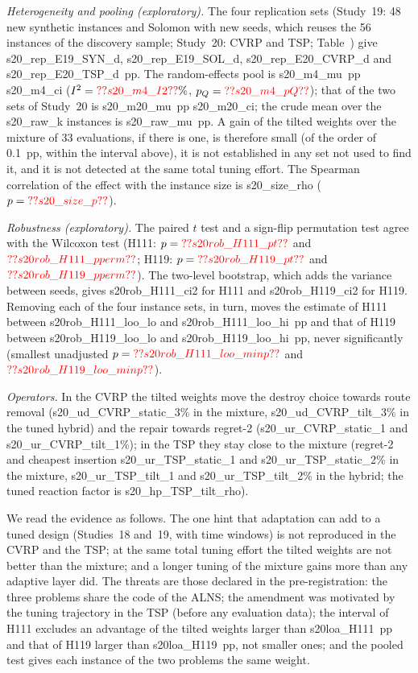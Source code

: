 \emph{Heterogeneity and pooling (exploratory).} The four replication sets (Study~19: 48 new synthetic instances and Solomon with new seeds, which reuses the 56 instances of the discovery sample; Study~20: CVRP and TSP; Table~) give \num{s20_rep_E19_SYN_d}, \num{s20_rep_E19_SOL_d}, \num{s20_rep_E20_CVRP_d} and \num{s20_rep_E20_TSP_d}~pp. The random-effects pool is \num{s20_m4_mu}~pp \num{s20_m4_ci} ($I^2=\num{s20_m4_I2}\%$, $p_Q=\num{s20_m4_pQ}$); that of the two sets of Study~20 is \num{s20_m20_mu}~pp \num{s20_m20_ci}; the crude mean over the \num{s20_raw_k} instances is \num{s20_raw_mu}~pp. A gain of the tilted weights over the mixture of 33 evaluations, if there is one, is therefore small (of the order of 0.1~pp, within the interval above), it is not established in any set not used to find it, and it is not detected at the same total tuning effort. The Spearman correlation of the effect with the instance size is \num{s20_size_rho} ($p=\num{s20_size_p}$).

\emph{Robustness (exploratory).} The paired $t$ test and a sign-flip permutation test agree with the Wilcoxon test (H111: $p=\num{s20rob_H111_pt}$ and $\num{s20rob_H111_pperm}$; H119: $p=\num{s20rob_H119_pt}$ and $\num{s20rob_H119_pperm}$). The two-level bootstrap, which adds the variance between seeds, gives \num{s20rob_H111_ci2} for H111 and \num{s20rob_H119_ci2} for H119. Removing each of the four instance sets, in turn, moves the estimate of H111 between \num{s20rob_H111_loo_lo} and \num{s20rob_H111_loo_hi}~pp and that of H119 between \num{s20rob_H119_loo_lo} and \num{s20rob_H119_loo_hi}~pp, never significantly (smallest unadjusted $p=\num{s20rob_H111_loo_minp}$ and $\num{s20rob_H119_loo_minp}$).

\emph{Operators.} In the CVRP the tilted weights move the destroy choice towards route removal (\num{s20_ud_CVRP_static_3}\% in the mixture, \num{s20_ud_CVRP_tilt_3}\% in the tuned hybrid) and the repair towards regret-2 (\num{s20_ur_CVRP_static_1} and \num{s20_ur_CVRP_tilt_1}\%); in the TSP they stay close to the mixture (regret-2 and cheapest insertion \num{s20_ur_TSP_static_1} and \num{s20_ur_TSP_static_2}\% in the mixture, \num{s20_ur_TSP_tilt_1} and \num{s20_ur_TSP_tilt_2}\% in the hybrid; the tuned reaction factor is \num{s20_hp_TSP_tilt_rho}).

We read the evidence as follows. The one hint that adaptation can add to a tuned design (Studies~18 and~19, with time windows) is not reproduced in the CVRP and the TSP; at the same total tuning effort the tilted weights are not better than the mixture; and a longer tuning of the mixture gains more than any adaptive layer did. The threats are those declared in the pre-registration: the three problems share the code of the ALNS; the amendment was motivated by the tuning trajectory in the TSP (before any evaluation data); the interval of H111 excludes an advantage of the tilted weights larger than \num{s20loa_H111}~pp and that of H119 larger than \num{s20loa_H119}~pp, not smaller ones; and the pooled test gives each instance of the two problems the same weight.

